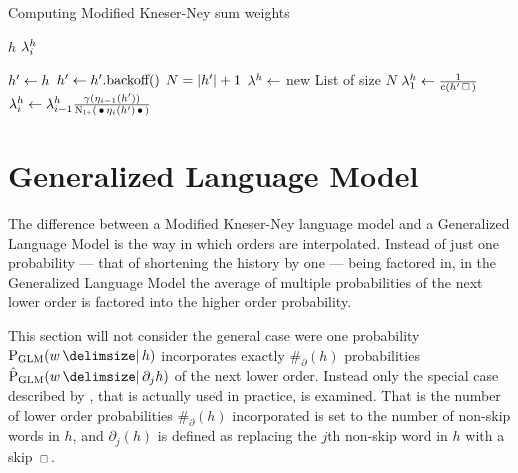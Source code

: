 \begin{algorithm}
  \caption{Computing Modified Kneser-Ney sum weights}
  \label{alg:weightedsum-mkn}
  \begin{algorithmic}[1]
    \Require $h$
    \Ensure $\lambda_i^h$

    \State $h^\prime \gets h$
      \State $h^\prime \gets h^\prime\text{.backoff()}$
    \EndWhile
    \State $N = \left|h^\prime\right| + 1$
    \State $\lambda^h \gets$ new List of size $N$
    \State $\SumWeight_1^h \gets \frac{1}{\Count(\SeenHistory \Skp)}$
      \State $\SumWeight_i^h \gets \SumWeight_{i-1}^h \frac{\gamma(\History_{i-1}(\SeenHistory))}{\ContCountIp(\WSkp \History_i(\SeenHistory) \WSkp)}$
    \EndFor
  \end{algorithmic}
\end{algorithm}

\section{Generalized Language Model}

The difference between a Modified Kneser-Ney language model and a
Generalized Language Model is the way in which orders are interpolated.
Instead of just one probability --- that of shortening the history by one ---
being factored in, in the Generalized Language Model the average of multiple
probabilities of the next lower order is factored into the higher order
probability.

This section will not consider the general case were one probability
$\ProbGLM{w}{h}$ incorporates exactly $\#_\partial(h)$ probabilities
$\ProbGLM*{w}{\partial_j h}$ of the next lower order.
Instead only the special case described by \textcite{Pickhardt2014}, that is
actually used in practice, is examined.
That is the number of lower order probabilities $\#_\partial(h)$ incorporated
is set to the number of non-skip words in $h$, and $\partial_j(h)$ is defined as
replacing the $j$th non-skip word in $h$ with a skip $\Skp$.

